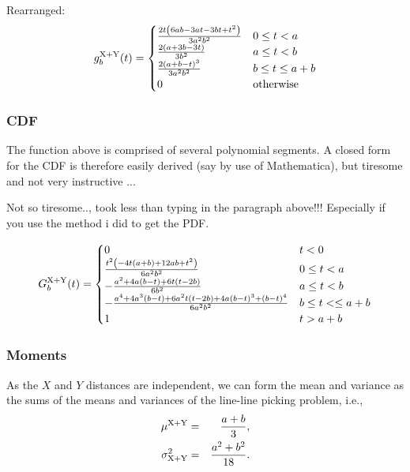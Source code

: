 Rearranged:
\begin{equation}
 g^{\rm X+Y}_b(t) =
 \begin{cases}
 \frac{2 t \left(6 a b-3 a t-3 b t+t^2\right)}{3 a^2 b^2}& 0 \le t < a \\
\frac{2 (a+3 b-3 t)}{3 b^2} & a \le t <  b \\
\frac{2 (a+b-t)^3}{3 a^2 b^2} & b \le t \le  a + b\\
 0 & \mbox{otherwise}
 \end{cases}
\end{equation}

\subsubsection{CDF}

The function above is comprised of several polynomial segments. A
closed form for the CDF is therefore easily derived (say by use of
Mathematica), but tiresome and not very instructive ...

Not so tiresome.., took less than typing in the paragraph above!!!
Especially if you use the method i did to get the PDF.

\begin{equation}
 G^{\rm X+Y}_b(t) =
 \begin{cases}
 0 & t < 0\\
\frac{t^2 \left(-4 t (a+b)+12 a b+t^2\right)}{6 a^2 b^2} & 0 \le t < a \\
-\frac{a^2+4 a (b-t)+6 t (t-2 b)}{6 b^2} & a\le t <  b \\
-\frac{a^4+4 a^3 (b-t)+6 a^2 t (t-2 b)+4 a (b-t)^3+(b-t)^4}{6 a^2 b^2} & b \le t < \le  a + b\\
 1 & t > a + b
 \end{cases}
\end{equation}


\subsubsection{Moments}

As the $X$ and $Y$ distances are independent, we can form the mean and
variance as the sums of the means and variances of the line-line
picking problem, i.e.,
\begin{eqnarray}
  \mu^{\rm X+Y} & = & \frac{a+b}{3}, \\
  \label{eq:rect_man_mean}
  \sigma^2_{\rm X+Y}
      & = & \frac{a^{2} + b^2}{18}.
  \label{eq:rect_man_var}
\end{eqnarray}


